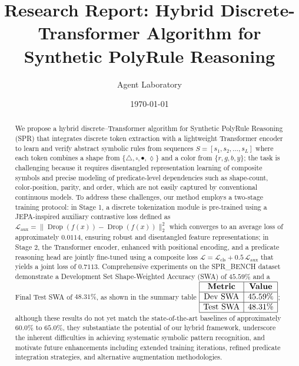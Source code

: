 \documentclass[11pt]{article}
\title{Research Report: Hybrid Discrete-Transformer Algorithm for Synthetic PolyRule Reasoning}
\author{Agent Laboratory}
\date{\today}
\begin{document}
\maketitle

\begin{abstract}
We propose a hybrid discrete–Transformer algorithm for Synthetic PolyRule Reasoning (SPR) that integrates discrete token extraction with a lightweight Transformer encoder to learn and verify abstract symbolic rules from sequences \(S = [s_1, s_2, \ldots, s_L]\) where each token combines a shape from \(\{\triangle, \square, \bullet, \lozenge\}\) and a color from \(\{r, g, b, y\}\); the task is challenging because it requires disentangled representation learning of composite symbols and precise modeling of predicate-level dependencies such as shape-count, color-position, parity, and order, which are not easily captured by conventional continuous models. To address these challenges, our method employs a two-stage training protocol: in Stage 1, a discrete tokenization module is pre-trained using a JEPA-inspired auxiliary contrastive loss defined as \(\mathcal{L}_{\text{aux}} = \| \operatorname{Drop}(f(x)) - \operatorname{Drop}(f(x)) \|_2^2\) which converges to an average loss of approximately \(0.0114\), ensuring robust and disentangled feature representations; in Stage 2, the Transformer encoder, enhanced with positional encoding, and a predicate reasoning head are jointly fine-tuned using a composite loss \(\mathcal{L} = \mathcal{L}_{\text{cls}} + 0.5\,\mathcal{L}_{\text{aux}}\) that yields a joint loss of \(0.7113\). Comprehensive experiments on the SPR\_BENCH dataset demonstrate a Development Set Shape-Weighted Accuracy (SWA) of \(45.59\%\) and a Final Test SWA of \(48.31\%\), as shown in the summary table \(\begin{array}{|c|c|}\hline \textbf{Metric} & \textbf{Value} \\\hline \text{Dev SWA} & 45.59\% \\\hline \text{Test SWA} & 48.31\% \\\hline \end{array}\); although these results do not yet match the state-of-the-art baselines of approximately \(60.0\%\) to \(65.0\%\), they substantiate the potential of our hybrid framework, underscore the inherent difficulties in achieving systematic symbolic pattern recognition, and motivate future enhancements including extended training iterations, refined predicate integration strategies, and alternative augmentation methodologies.
\end{abstract}
\end{document}
